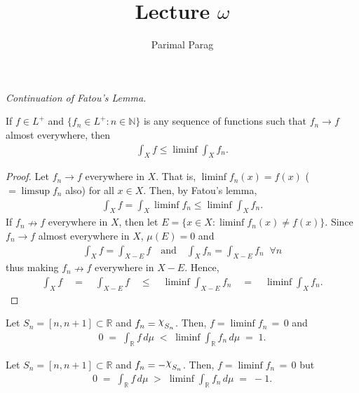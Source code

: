 \documentclass[a4paper,english,12pt]{article}
\newcommand{\goodchi}{\protect\raisebox{2.5pt}{$\chi$}}
\begin{document}
\title{Lecture $\omega$ }
\author{Parimal Parag}
\maketitle

\textit{Continuation of Fatou's Lemma.}

\begin{cor} If $f\in L^+$ and $\{f_n\in L^+:n\in \mathbb{N}\}$ is any sequence of functions such that $f_n\rightarrow f$ almost everywhere, then 
	\begin{align*} 
		\int_X f \leqslant \liminf \int_X f_n.
	\end{align*}
\label{fatou_ae}	
\end{cor}
\begin{proof} Let $f_n\rightarrow f$ everywhere in $X$. That is, $\liminf f_n(x)=f(x)$ ($=\limsup f_n$ also) for all $x\in X$. Then, by Fatou's lemma, 
	\begin{align*} 
		\int_X f =\int_X \liminf f_n \leqslant \liminf \int_X f_n.
	\end{align*}
If $f_n\nrightarrow f$ everywhere in $X$, then let $E=\{x\in X:\liminf f_n(x)\neq f(x)\}$. Since $f_n\rightarrow f$ almost everywhere in $X$, $\mu (E)=0$ and 
	\begin{align*} 
		\int_X f =\int_{X-E} f \quad\text{and}\quad \int_X f_n =\int_{X-E} f_n \;\;\forall n
	\end{align*}
thus making $f_n\nrightarrow f$ everywhere in $X-E$. Hence,
	\begin{align*} 
		\int_X f \quad=\quad \int_{X-E} f \quad\leqslant\quad \liminf \int_{X-E} f_n \quad=\quad \liminf \int_X f_n.
	\end{align*}
\end{proof}

\begin{exmp} Let $S_n=[n,n+1]\subset \mathbb{R}$ and $f_n=\goodchi _{S_n}$. Then, $f=\liminf f_n\,=\,0$ and
	\begin{align*}
		0 \;=\; \int_{\mathbb{R}}f\,d\mu \;<\; \liminf \int_{\mathbb{R}}f_n\,d\mu \;=\;1.
	\end{align*}
\end{exmp}


\begin{exmp} Let $S_n=[n,n+1]\subset \mathbb{R}$ and $f_n=-\goodchi _{S_n}$. Then, $f=\liminf f_n\,=\,0$ but 
	\begin{align*}
		0 \;=\; \int_{\mathbb{R}}f\,d\mu \;>\; \liminf \int_{\mathbb{R}}f_n\,d\mu \;=\;-1.
	\end{align*}
\end{exmp}
\end{document}
